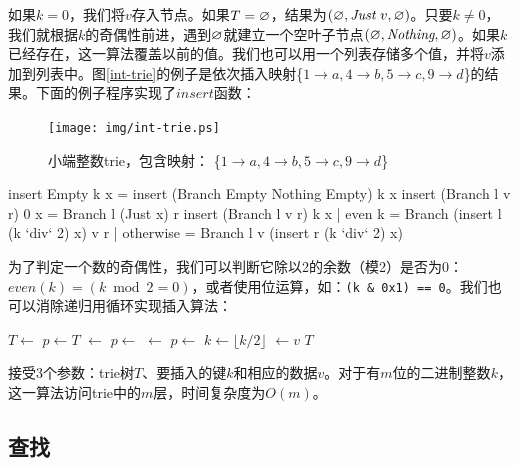 \documentclass[b5paper]{ctexart}
\begin{document}
如果$k = 0$，我们将$v$存入节点。如果$T = \varnothing$，结果为$(\varnothing, \textit{Just}\ v, \varnothing)$。只要$k \neq 0$，我们就根据$k$的奇偶性前进，遇到$\varnothing$就建立一个空叶子节点$(\varnothing, \textit{Nothing}, \varnothing)$。如果$k$已经存在，这一算法覆盖以前的值。我们也可以用一个列表存储多个值，并将$v$添加到列表中。图\ref{int-trie}的例子是依次插入映射\{$ 1 \rightarrow a, 4 \rightarrow b, 5 \rightarrow c, 9 \rightarrow d$\}的结果。下面的例子程序实现了$insert$函数：

\begin{figure}[htbp]
  \centering
  \texttt{[image: img/int-trie.ps]}
  \caption{小端整数trie，包含映射：
          \{$ 1 \rightarrow a, 4 \rightarrow b, 5 \rightarrow c, 9 \rightarrow d$\}}
  \label{fig:int-trie}
\end{figure}

\begin{Haskell}
insert Empty k x = insert (Branch Empty Nothing Empty) k x
insert (Branch l v r) 0 x = Branch l (Just x) r
insert (Branch l v r) k x | even k    = Branch (insert l (k `div` 2) x) v r
                          | otherwise = Branch l v (insert r (k `div` 2) x)
\end{Haskell}

为了判定一个数的奇偶性，我们可以判断它除以2的余数（模2）是否为0：$even(k) = (k \bmod 2 = 0)$，或者使用位运算，如：\texttt{(k \& 0x1) == 0}。我们也可以消除递归用循环实现插入算法：

\begin{algorithmic}[1]
    \State $T \gets$   
  \EndIf
  \State $p \gets T$
        \State {} $\gets$ 
      \EndIf
      \State $p \gets$ 
    \Else
        \State {} $\gets$ 
      \EndIf
      \State $p \gets$ 
    \EndIf
    \State $k \gets \lfloor k/2 \rfloor$
  \EndWhile
  \State {} $\gets v$
  \State \Return $T$
\EndFunction
\end{algorithmic}

接受3个参数：trie树$T$、要插入的键$k$和相应的数据$v$。对于有$m$位的二进制整数$k$，这一算法访问trie中的$m$层，时间复杂度为$O(m)$。

\subsection{查找}
\end{document}
